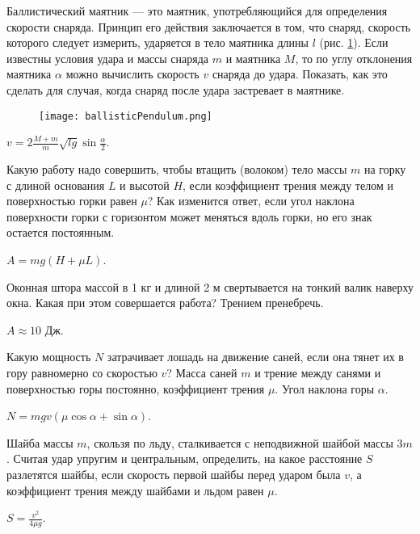 \begin{ex} %
Баллистический маятник — это маятник, употребляющийся для определения скорости снаряда. Принцип его действия заключается в том, что снаряд, скорость которого следует измерить, ударяется в тело маятника длины $l$ (рис. \ref{ballisticPendulum}). Если известны условия удара и массы снаряда $m$ и маятника $M$, то по углу отклонения маятника $\alpha$ можно вычислить скорость $v$ снаряда до удара. Показать, как это сделать для случая, когда снаряд после удара застревает в маятнике.

\begin{figure}[h]
\centering
\texttt{[image: ballisticPendulum.png]}
\caption{}
\label{ballisticPendulum}
\end{figure}

\begin{ans}
$v = 2\frac{M+m}{m}\sqrt{lg}\sin \frac{\alpha}{2}$.
\end{ans}
\end{ex}

\begin{ex} %
Какую работу надо совершить, чтобы втащить (волоком) тело массы $m$ на горку с длиной основания $L$ и высотой $H$, если коэффициент трения между телом и поверхностью горки равен $\mu$? Как изменится ответ, если угол наклона поверхности горки с горизонтом может меняться вдоль горки, но его знак остается постоянным.
\begin{ans}
$A=mg(H+\mu L)$.
\end{ans}
\end{ex}

\begin{ex}
Оконная штора массой в 1 кг и длиной 2 м свертывается на тонкий валик наверху окна. Какая при этом совершается работа? Трением пренебречь.
\begin{ans}
$A \approx 10$ Дж.
\end{ans}
\end{ex}

\begin{ex} %
Какую мощность $N$ затрачивает лошадь на движение саней, если она тянет их в гору равномерно со скоростью $v$? Масса саней $m$ и трение между санями и поверхностью горы постоянно, коэффициент трения $\mu$. Угол наклона горы $\alpha$.
\begin{ans}
$N = mgv(\mu \cos \alpha +\sin \alpha)$.
\end{ans}
\end{ex}

\begin{ex} %
Шайба массы $m$, скользя по льду, сталкивается с неподвижной шайбой массы $3m$. Считая удар упругим и центральным, определить, на какое расстояние $S$ разлетятся шайбы, если скорость первой шайбы перед ударом была $v$, а коэффициент трения между шайбами и льдом равен $\mu$.
\begin{ans}
$S = \frac{v^2}{4 \mu g}$.
\end{ans}
\end{ex}

